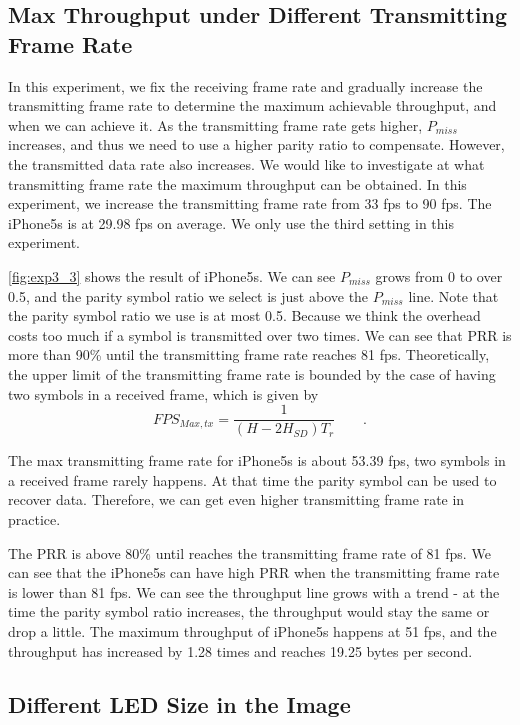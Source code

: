 \subsection{Max Throughput under Different Transmitting Frame Rate}
\label{sec:maxthroughput}
In this experiment, we fix the receiving frame rate and gradually increase the transmitting frame rate to determine the maximum achievable throughput, and when we can achieve it. As the transmitting frame rate gets higher, $P_{miss}$ increases, and thus we need to use a higher parity ratio to compensate. However, the transmitted data rate also increases. We would like to investigate at what transmitting frame rate the maximum throughput can be obtained.
In this experiment, we increase the transmitting frame rate from 33 fps to 90 fps. The iPhone5s is at 29.98 fps on average. We only use the third setting in this experiment.

\autoref{fig:exp3_3} shows the result of iPhone5s. We can see $P_{miss}$ grows from 0 to over 0.5, and the parity symbol ratio we select is just above the $P_{miss}$ line. Note that the parity symbol ratio we use is at most 0.5. Because we think the overhead costs too much if a symbol is transmitted over two times. We can see that PRR is more than 90\% until the transmitting frame rate reaches 81 fps. 
Theoretically, the upper limit of the transmitting frame rate is bounded by the case of having two symbols in a received frame, which is given by 
\begin{equation}
FPS_{Max,tx}= \frac{1}{(H - 2H_{SD}) T_r} \qquad \textrm{.}
\end{equation}

The max transmitting frame rate for iPhone5s is about 53.39 fps, two symbols in a received frame rarely happens. At that time the parity symbol can be used to recover data. Therefore, we can get even higher transmitting frame rate in practice.

The PRR is above 80\% until reaches the transmitting frame rate of 81 fps. We can see that the iPhone5s can have high PRR when the transmitting frame rate is lower than 81 fps.
We can see the throughput line grows with a trend - at the time the parity symbol ratio increases, the throughput would stay the same or drop a little. The maximum throughput of iPhone5s happens at 51 fps, and the throughput has increased by 1.28 times and reaches 19.25 bytes per second.



\subsection{Different LED Size in the Image}

